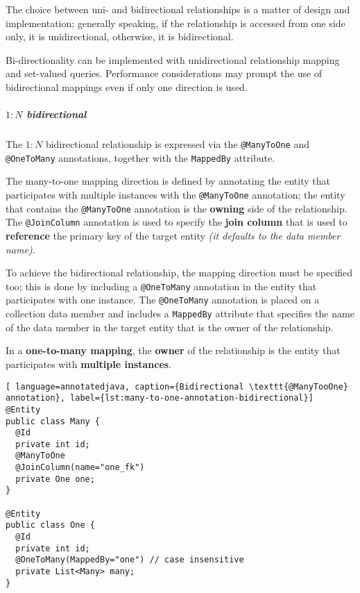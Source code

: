 \documentclass[english]{article}
\begin{document}
The choice between uni- and bidirectional relationships is a matter of design and implementation;
generally speaking, if the relationship is accessed from one side only, it is unidirectional, otherwise, it is bidirectional.

Bi-directionality can be implemented with unidirectional relationship mapping and set-valued queries.
Performance considerations may prompt the use of bidirectional mappings even if only one direction is used.

\begin{onepage}
  \subparagraph*{\(1:N\) bidirectional}

  The \(1:N\) bidirectional relationship is expressed via the \texttt{@ManyToOne} and \texttt{@OneToMany} annotations, together with the \texttt{MappedBy} attribute.

  The many-to-one mapping direction is defined by annotating the entity that participates with multiple instances with the \texttt{@ManyToOne} annotation;
  the entity that contains the \texttt{@ManyToOne} annotation is the \textbf{owning} side of the relationship.
  The \texttt{@JoinColumn} annotation is used to specify the \textbf{join column} that is used to \textbf{reference} the primary key of the target entity \textit{(it defaults to the data member name)}.

  To achieve the bidirectional relationship, the mapping direction must be specified too;
  this is done by including a \texttt{@OneToMany} annotation in the entity that participates with one instance.
  The \texttt{@OneToMany} annotation is placed on a collection data member and includes a \texttt{MappedBy} attribute that specifies the name of the data member in the target entity that is the owner of the relationship.

  In a \textbf{one-to-many mapping}, the \textbf{owner} of the relationship is the entity that participates with \textbf{multiple instances}.

  \begin{lstlisting}[ language=annotatedjava, caption={Bidirectional \texttt{@ManyTooOne} annotation}, label={lst:many-to-one-annotation-bidirectional}]
@Entity
public class Many {
  @Id
  private int id;
  @ManyToOne
  @JoinColumn(name="one_fk")
  private One one;
}

@Entity
public class One {
  @Id
  private int id;
  @OneToMany(MappedBy="one") // case insensitive
  private List<Many> many;
}
\end{lstlisting}
\end{onepage}
\end{document}
